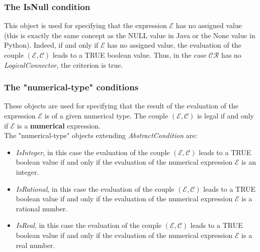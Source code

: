 \documentclass[a4paper,11pt] {article}
\begin{document}
\subsubsection{The IsNull condition}\label{par-IsNull}
This object is used for specifying that the expression $\mathcal E$ has no assigned value (this is
exactly the same concept as the NULL value in Java or the None value in Python).
Indeed, if and only if $\mathcal E$ has no assigned value, the evaluation of the couple $(\mathcal
E, \mathcal C)$ leads to a TRUE boolean value. Thus, in the case $\mathcal{CR}$ has no {\it
LogicalConnector}, the criterion is true.



\subsubsection{The "numerical-type" conditions}
These objects are used for specifying that the result of the evaluation of the expression $\mathcal
E$ is of a given numerical type. The couple $(\mathcal E, \mathcal C)$ is legal if and only if
$\mathcal E$ is a {\bf numerical} expression. \\
The "numerical-type" objects extending {\it AbstractCondition}  are:
\begin{itemize}
\item {\it IsInteger}, in this case the evaluation of the couple $(\mathcal E, \mathcal C)$ leads to
a TRUE boolean value if and only if the evaluation of the numerical expression $\mathcal E$ is an
integer.
\item {\it IsRational}, in this case the evaluation of the couple $(\mathcal E, \mathcal C)$ leads
to a TRUE boolean value if and only if the evaluation of the numerical expression $\mathcal E$ is a
rational number.
\item {\it IsReal}, in this case the evaluation of the couple $(\mathcal E, \mathcal C)$ leads to a
TRUE boolean value
if and only if the evaluation of the numerical expression $\mathcal E$ is a real number.
\end{itemize} 
\end{document}
